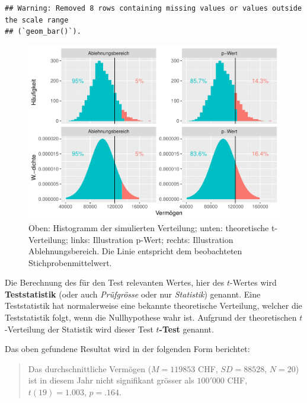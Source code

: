 \documentclass[
]{book}
\theoremstyle{definition}
\theoremstyle{definition}
\theoremstyle{definition}
\theoremstyle{definition}
\theoremstyle{remark}
\begin{document}
\begin{verbatim}
## Warning: Removed 8 rows containing missing values or values outside the scale range
## (`geom_bar()`).
\end{verbatim}

\begin{figure}
\centering
\includegraphics{aps_statistik1_files/figure-latex/exm-vermoegen-plots-sampling-theorie-1.pdf}
\caption{\label{fig:exm-vermoegen-plots-sampling-theorie}Oben: Histogramm der simulierten Verteilung; unten: theoretische t-Verteilung; links: Illustration p-Wert; rechts: Illustration Ablehnungsbereich. Die Linie entspricht dem beobachteten Stichprobenmittelwert.}
\end{figure}

\label{customdef-teststatistik}{Die Berechnung des für den Test relevanten Wertes, hier des \(t\)-Wertes wird \textbf{Teststatistik} (oder auch \emph{Prüfgrösse} oder nur \emph{Statistik}) genannt.} Eine Teststatistik hat normalerweise eine bekannte theoretische Verteilung, welcher die Teststatistik folgt, wenn die Nullhypothese wahr ist. \label{customdef-t-test}{Aufgrund der theoretischen \(t\)-Verteilung der Statistik wird dieser Test \textbf{\(t\)-Test} genannt.}

Das oben gefundene Resultat wird in der folgenden Form berichtet:

\begin{quote}
Das durchschnittliche Vermögen (\(M = 119853\) CHF, \(SD = 88528\), \(N = 20\)) ist in diesem Jahr nicht signifikant grösser als \(100'000\) CHF, \(t(19) = 1.003\), \(p = .164\).
\end{quote}
\end{document}
